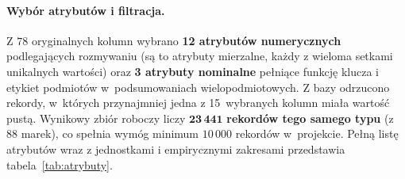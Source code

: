 \documentclass{article}
\begin{document}
\paragraph{Wybór atrybutów i filtracja.} Z $78$ oryginalnych kolumn wybrano
\textbf{12 atrybutów numerycznych} podlegających rozmywaniu (są to atrybuty
mierzalne, każdy z wieloma setkami unikalnych wartości) oraz \textbf{3
atrybuty nominalne} pełniące funkcję klucza i etykiet podmiotów
w~podsumowaniach wielopodmiotowych. Z bazy odrzucono rekordy, w~których
przynajmniej jedna z 15~wybranych kolumn miała wartość pustą. Wynikowy
zbiór roboczy liczy $\mathbf{23\,441}$ \textbf{rekordów tego samego typu}
(z~$88$ marek), co spełnia wymóg minimum $10\,000$ rekordów w~projekcie.
Pełną listę atrybutów wraz z jednostkami i empirycznymi zakresami
przedstawia tabela~\ref{tab:atrybuty}.
\end{document}

